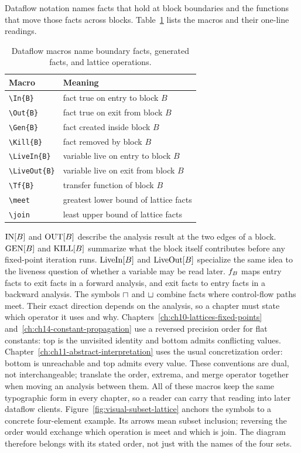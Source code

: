 Dataflow notation names facts that hold at block boundaries and the functions that move those facts across blocks.
Table~\ref{tab:app-c-dataflow} lists the macros and their one-line readings.
\begin{table}
  \centering
  \caption{Dataflow macros name boundary facts, generated facts, and lattice operations.}
  \label{tab:app-c-dataflow}
  \begin{tabular}{ll}
    \toprule
    Macro & Meaning \\
    \midrule
    \texttt{\textbackslash In\{B\}} & fact true on entry to block $B$ \\
    \texttt{\textbackslash Out\{B\}} & fact true on exit from block $B$ \\
    \texttt{\textbackslash Gen\{B\}} & fact created inside block $B$ \\
    \texttt{\textbackslash Kill\{B\}} & fact removed by block $B$ \\
    \texttt{\textbackslash LiveIn\{B\}} & variable live on entry to block $B$ \\
    \texttt{\textbackslash LiveOut\{B\}} & variable live on exit from block $B$ \\
    \texttt{\textbackslash Tf\{B\}} & transfer function of block $B$ \\
    \texttt{\textbackslash meet} & greatest lower bound of lattice facts \\
    \texttt{\textbackslash join} & least upper bound of lattice facts \\
    \bottomrule
  \end{tabular}
\end{table}
$\mathrm{IN}[B]$ and $\mathrm{OUT}[B]$ describe the analysis result at the two edges of a block.
$\mathrm{GEN}[B]$ and $\mathrm{KILL}[B]$ summarize what the block itself contributes before any fixed-point iteration runs.
$\mathrm{LiveIn}[B]$ and $\mathrm{LiveOut}[B]$ specialize the same idea to the liveness question of whether a variable may be read later.
$f_{B}$ maps entry facts to exit facts in a forward analysis, and exit facts to entry facts in a backward analysis.
The symbols $\sqcap$ and $\sqcup$ combine facts where control-flow paths meet.
Their exact direction depends on the analysis, so a chapter must state which operator it uses and why.
Chapters~\ref{ch:ch10-lattices-fixed-points} and~\ref{ch:ch14-constant-propagation} use a reversed precision order for flat constants: top is the unvisited identity and bottom admits conflicting values.
Chapter~\ref{ch:ch11-abstract-interpretation} uses the usual concretization order: bottom is unreachable and top admits every value.
These conventions are dual, not interchangeable; translate the order, extrema, and merge operator together when moving an analysis between them.
All of these macros keep the same typographic form in every chapter, so a reader can carry that reading into later dataflow clients.
Figure~\ref{fig:visual-subset-lattice} anchors the symbols to a concrete four-element example.
Its arrows mean subset inclusion; reversing the order would exchange which operation is meet and which is join.
The diagram therefore belongs with its stated order, not just with the names of the four sets.

